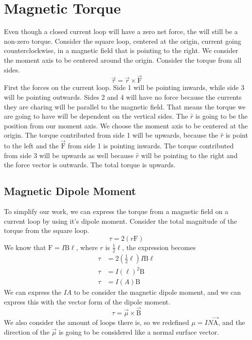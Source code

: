 \section{Magnetic Torque}
Even though a closed current loop will have a zero net force, the will still be a non-zero torque. Consider the square loop, centered at the origin, current going counterclockwise, in a magnetic field that is pointing to the right. We consider the moment axis to be centered around the origin. Consider the torque from all sides. 
\begin{equation*}
	\vec{\tau} = \vec{r} \times \vec{\mathrm{F}}
\end{equation*}
First the forces on the current loop. Side 1 will be pointing inwards, while side 3 will be pointing outwards. Sides 2 and 4 will have no force because the currents they are charing will be parallel to the magnetic field. That means the torque we are going to have will be dependent on the vertical sides. The $\hat{r}$ is going to be the position from our moment axis. We choose the moment axis to be centered at the origin. The torque contributed from side 1 will be upwards, because the $\hat{r}$ is point to the left and the $\vec{\mathrm{F}}$ from side 1 is pointing inwards. The torque contributed from side 3 will be upwards as well because $\hat{r}$ will be pointing to the right and the force vector is outwards. The total torque is upwards. 
\subsection{Magnetic Dipole Moment}
To simplify our work, we can express the torque from a magnetic field on a current loop by using it's dipole moment. Consider the total magnitude of the torque from the square loop.
\begin{equation*}
	\tau = 2(r\mathrm{F})
\end{equation*}
We know that $\mathrm{F}=I\mathrm{B}\ell$, where $r$ is $\frac{1}{2}\ell$, the expression becomes 
\begin{align*}
	\tau &= 2(\frac{1}{2}\ell)I\mathrm{B}\ell \\ 
	\tau &= I(\ell)^2\mathrm{B} \\ 
	\tau &= I(A)\mathrm{B}
\end{align*}
We can express the $IA$ to be consider the magnetic dipole moment, and we can express this with the vector form of the dipole moment. 
\begin{equation*}
	\tau = \vec{\mu} \times \vec{\mathrm{B}}
\end{equation*}
We also consider the amount of loops there is, so we redefined $\mu = IN\vec{\mathrm{A}}$, and the direction of the $\vec{\mu}$ is going to be considered like a normal surface vector.
